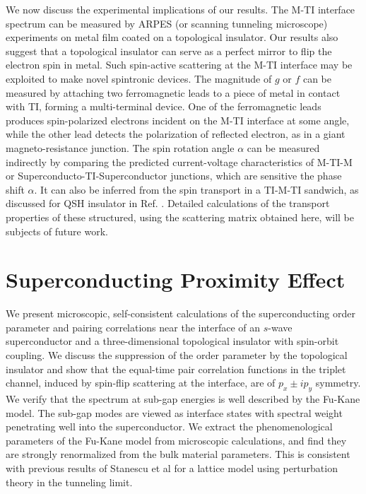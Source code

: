\documentclass[11pt]{report}
\begin{document}
We now discuss the experimental implications of our results. The M-TI interface spectrum can be measured by 
ARPES (or scanning tunneling microscope) experiments on metal film coated on a topological insulator.
Our results also suggest that a topological insulator can serve as a perfect mirror to flip the 
electron spin in metal. Such spin-active scattering at the M-TI interface may be 
exploited to make novel spintronic devices. The magnitude of $g$ or $f$
can be measured by attaching two ferromagnetic leads to a piece of metal in contact with TI, 
forming a multi-terminal device. 
One of the ferromagnetic leads produces spin-polarized electrons incident on the M-TI interface at some angle, while 
the other lead detects the polarization of reflected electron, as in a
giant magneto-resistance junction. The spin rotation angle $\alpha$ can be measured 
indirectly by comparing the predicted current-voltage characteristics of M-TI-M 
or Superconducto-TI-Superconductor junctions, which are sensitive the phase shift $\alpha$. It can also be inferred from 
the spin transport in a TI-M-TI sandwich, as discussed for QSH insulator in Ref. \cite{yokoyama09}.
Detailed calculations of the transport properties of these structured,
using the scattering matrix obtained here, will be subjects of future work.

\chapter{Superconducting Proximity Effect}

We present microscopic, self-consistent calculations of the 
superconducting order parameter and pairing correlations near the 
interface of an $s$-wave superconductor and
a three-dimensional topological insulator with spin-orbit coupling.
%
We discuss the suppression of the order parameter by the topological 
insulator and show that the equal-time pair correlation functions
in the triplet channel, induced by spin-flip scattering at the interface, 
are of $p_x\pm i p_y$ symmetry.
%
We verify that the spectrum at sub-gap energies is well described by
the Fu-Kane model. The sub-gap modes are viewed as interface states with
spectral weight penetrating well into the superconductor. 
We extract the phenomenological 
parameters of the Fu-Kane model from microscopic calculations, and find they
are strongly renormalized from the bulk material parameters. This is consistent 
with previous results of Stanescu et al for a lattice model using perturbation
theory in the tunneling limit.
\end{document}

